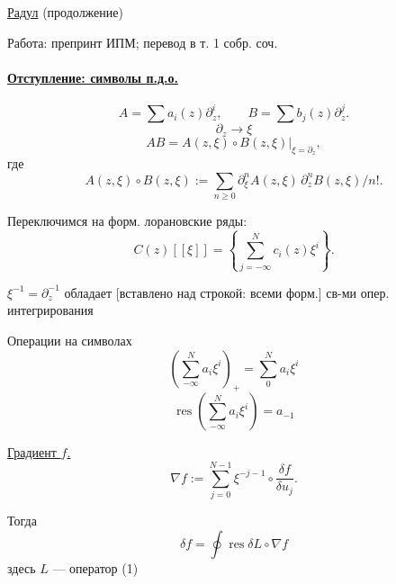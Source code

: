 \underline{Радул} (продолжение)

Работа: препринт ИПМ; перевод в т. 1 собр. соч.

\paragraph*{\underline{Отступление: символы п.д.о.}}
\begin{equation*}
A=\sum a_i(z)\partial_z^i,\qquad
B=\sum b_j(z)\partial_z^j . \tag{4}
\end{equation*}
\begin{equation*}
\partial_z\longrightarrow\xi
\end{equation*}
\begin{equation*}
AB=\left.A(z,\xi)\circ B(z,\xi)\right|_{\xi=\partial_z}, \tag{5}
\end{equation*}
где
\begin{equation*}
A(z,\xi)\circ B(z,\xi):=
\sum_{n\geq0}\partial_\xi^n A(z,\xi)\,\partial_z^n B(z,\xi)/n!.
\end{equation*}

Переключимся на форм. лорановские ряды:
\begin{equation*}
C(z)[[\xi]]=\left\{\sum_{j=-\infty}^{N}c_i(z)\xi^i\right\}. \tag{6}
\end{equation*}

$\xi^{-1}=\partial_z^{-1}$ обладает
[вставлено над строкой: всеми форм.]
св-ми опер. интегрирования

Операции на символах
\begin{equation*}
\left(\sum_{-\infty}^{N}a_i\xi^i\right)_+
=\sum_{0}^{N}a_i\xi^i \tag{7}
\end{equation*}
\begin{equation*}
\operatorname{res}\left(\sum_{-\infty}^{N}a_i\xi^i\right)=a_{-1} \tag{8}
\end{equation*}

\underline{Градиент $f$.}
\begin{equation*}
\nabla f:=\sum_{j=0}^{N-1}\xi^{-j-1}\circ\frac{\delta f}{\delta u_j}. \tag{9}
\end{equation*}


Тогда
\begin{equation*}
\delta f=\oint\operatorname{res}\delta L\circ\nabla f \tag{10}
\end{equation*}
здесь $L$ — оператор (1)

